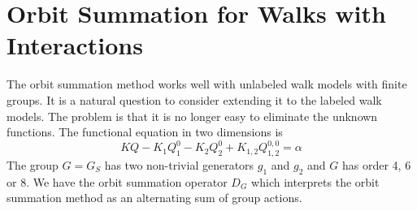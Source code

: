 
\chapter{Orbit Summation for Walks with Interactions}

The orbit summation method works well with unlabeled walk models with finite groups. It is a natural question to consider extending it to the labeled walk models. The problem is that it is no longer easy to eliminate the unknown functions. The functional equation in two dimensions is
\[
	KQ  - K_1 Q_1^0 -  K_2 Q_2^0 + K_{1,2}Q_{1,2}^{0,0} = \alpha
\]
The group $G = G_S$ has two non-trivial generators $g_1$ and $g_2$ and $G$ has order 4, 6 or 8. We have the orbit summation operator $D_G$ which interprets the orbit summation method as an alternating sum of group actions.

